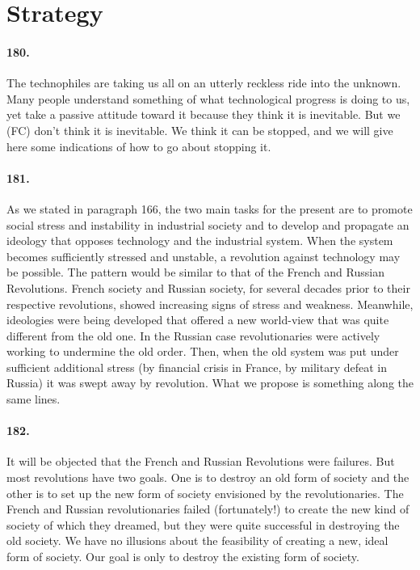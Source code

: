 \documentclass[12pt]{book}
\newcommand{\mysection}[1]{\section*{#1} \addcontentsline{toc}{section}{#1}}
\begin{document}
\mysection{Strategy}


\paragraph{180.}  The technophiles are taking us all on an utterly reckless ride into the unknown. Many people understand something of what technological progress is doing to us, yet take a passive attitude toward it because they think it is inevitable. But we (FC) don't think it is inevitable. We think it can be stopped, and we will give here some indications of how to go about stopping it.


\paragraph{181.}  As we stated in paragraph 166, the two main tasks for the present are to promote social stress and instability in industrial society and to develop and propagate an ideology that opposes technology and the industrial system. When the system becomes sufficiently stressed and unstable, a revolution against technology may be possible. The pattern would be similar to that of the French and Russian Revolutions. French society and Russian society, for several decades prior to their respective revolutions, showed increasing signs of stress and weakness. Meanwhile, ideologies were being developed that offered a new world-view that was quite different from the old one. In the Russian case revolutionaries were actively working to undermine the old order. Then, when the old system was put under sufficient additional stress (by financial crisis in France, by military defeat in Russia) it was swept away by revolution. What we propose is something along the same lines.


\paragraph{182.}  It will be objected that the French and Russian Revolutions were failures. But most revolutions have two goals. One is to destroy an old form of society and the other is to set up the new form of society envisioned by the revolutionaries. The French and Russian revolutionaries failed (fortunately!) to create the new kind of society of which they dreamed, but they were quite successful in destroying the old society. We have no illusions about the feasibility of creating a new, ideal form of society. Our goal is only to destroy the existing form of society.
\end{document}
